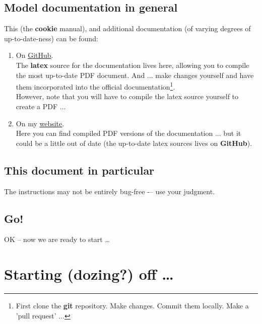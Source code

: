 \subsection*{Model documentation in general}

This (the \textbf{cookie} manual), and additional documentation (of varying degrees of up-to-date-ness) can be found:

\vspace{1mm}
\begin{enumerate}[noitemsep]
\setlength{\itemindent}{.2in}
\item On \href{https://github.com/genie-model/cookiedoc}{GitHub}.
\\The \textbf{latex} source for the documentation lives here, allowing you to compile the most up-to-date PDF document. And ... make changes yourself and have them incorporated into the official documentation\footnote{First clone the \textbf{git} repository. Make changes. Commit them locally. Make a 'pull request' ...}.
\\However, note that you will have to compile the latex source yourself to create a PDF ...
\item On my \href{http://www.seao2.info/mymuffin.html}{website}.
\\Here you can find compiled PDF versions of the documentation ... but it could be a little out of date (the up-to-date latex sources lives on \textbf{GitHub}).
\end{enumerate}


\subsection*{This document in particular}

The instructions  may not be entirely bug-free -– use your judgment.


\subsection*{Go!}

OK – now we are ready to start …

\newpage

\section{Starting (dozing?) off …}

